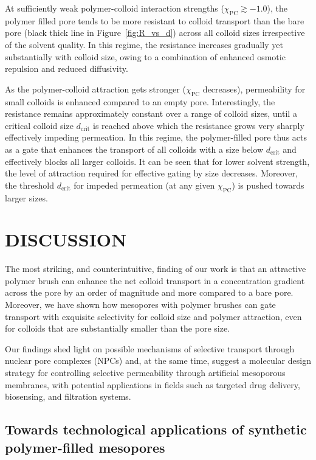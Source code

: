 \documentclass[12pt, a4paper]{article}
\begin{document}
At sufficiently weak polymer-colloid interaction strengths ($\chi_{\text{PC}} \gtrsim -1.0$), the polymer filled pore tends to be more resistant to colloid transport than the bare pore (black thick line in Figure~\ref{fig:R_vs_d}) across all colloid sizes irrespective of the solvent quality.
In this regime, the resistance increases gradually yet substantially with colloid size, owing to a combination of enhanced osmotic repulsion and reduced diffusivity.

As the polymer-colloid attraction gets stronger ($\chi_{\text{PC}}$ decreases), permeability for small colloids is enhanced compared to an empty pore. 
Interestingly, the resistance remains approximately constant over a range of colloid sizes, until a critical colloid size $d_{\text{crit}}$ is reached above which the resistance grows very sharply effectively impeding permeation. 
In this regime, the polymer-filled pore thus acts as a gate that enhances the transport of all colloids with a size below $d_{\text{crit}}$ and effectively blocks all larger colloids.
It can be seen that for lower solvent strength, the level of attraction required for effective gating by size decreases. 
Moreover, the threshold $d_{\text{crit}}$ for impeded permeation (at any given $\chi_{\text{PC}}$) is pushed towards larger sizes.


\section{DISCUSSION}

The most striking, and counterintuitive, finding of our work is that an attractive polymer brush can enhance the net colloid transport in a concentration gradient across the pore by an order of magnitude and more compared to a bare pore.
Moreover, we have shown how mesopores with polymer brushes can gate transport with exquisite selectivity for colloid size and polymer attraction, even for colloids that are substantially smaller than the pore size.

Our findings shed light on possible mechanisms of selective transport through nuclear pore complexes (NPCs) and, at the same time, suggest a molecular design strategy for controlling selective permeability through artificial mesoporous membranes, with potential applications in fields such as targeted drug delivery, biosensing, and filtration systems.

\subsection{Towards technological applications of synthetic polymer-filled mesopores}
\end{document}
